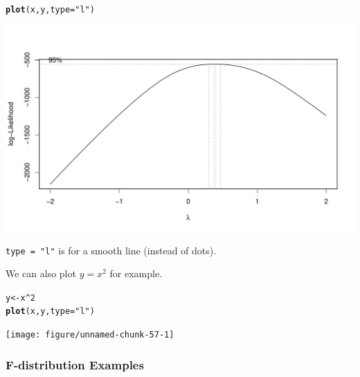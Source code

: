 \documentclass[oneside]{book}\usepackage[]{graphicx}\usepackage[dvipsnames,table,xcdraw]{xcolor}
\makeatletter
\def\maxwidth{ %
  \ifdim\Gin@nat@width>\linewidth
    \linewidth
  \else
    \Gin@nat@width
  \fi
}
\newcommand{\hlnum}[1]{\textcolor[rgb]{0.686,0.059,0.569}{#1}}%
\newcommand{\hlstr}[1]{\textcolor[rgb]{0.192,0.494,0.8}{#1}}%
\newcommand{\hlopt}[1]{\textcolor[rgb]{0,0,0}{#1}}%
\newcommand{\hlstd}[1]{\textcolor[rgb]{0.345,0.345,0.345}{#1}}%
\newcommand{\hlkwb}[1]{\textcolor[rgb]{0.69,0.353,0.396}{#1}}%
\newcommand{\hlkwc}[1]{\textcolor[rgb]{0.333,0.667,0.333}{#1}}%
\newcommand{\hlkwd}[1]{\textcolor[rgb]{0.737,0.353,0.396}{\textbf{#1}}}%
\newenvironment{kframe}{%
 \def\at@end@of@kframe{}%
 \ifinner\ifhmode%
  \def\at@end@of@kframe{\end{minipage}}%
  \begin{minipage}{\columnwidth}%
 \fi\fi%
 \def\FrameCommand##1{\hskip\@totalleftmargin \hskip-\fboxsep
 \colorbox{shadecolor}{##1}\hskip-\fboxsep
     \hskip-\linewidth \hskip-\@totalleftmargin \hskip\columnwidth}%
 \MakeFramed {\advance\hsize-\width
   \@totalleftmargin\z@ \linewidth\hsize
   \@setminipage}}%
 {\par\unskip\endMakeFramed%
 \at@end@of@kframe}
\newenvironment{knitrout}{}{} %
\newcommand{\code}[1]{\texttt{#1}}
\makeatother
\begin{document}
\begin{knitrout}
\color{fgcolor}\begin{kframe}
\begin{alltt}
\hlkwd{plot}\hlstd{(x, y,} \hlkwc{type} \hlstd{=} \hlstr{"l"}\hlstd{)}
\end{alltt}
\end{kframe}

{\centering \includegraphics[width=\maxwidth]{figure/unnamed-chunk-56-1} 

}


\end{knitrout}

\code{type = "l"} is for a smooth line (instead of dots).

We can also plot $y=x^2$ for example.
\begin{knitrout}
\color{fgcolor}\begin{kframe}
\begin{alltt}
\hlstd{y} \hlkwb{<-} \hlstd{x}\hlopt{^}\hlnum{2}
\hlkwd{plot}\hlstd{(x, y,} \hlkwc{type} \hlstd{=} \hlstr{"l"}\hlstd{)}
\end{alltt}
\end{kframe}

{\centering \texttt{[image: figure/unnamed-chunk-57-1]} 

}


\end{knitrout}

\subsubsection{F-distribution Examples}
\end{document}
